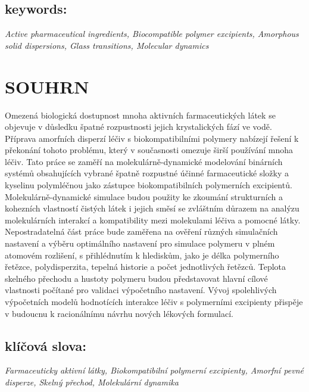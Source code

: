 \subsection*{keywords:}
\textit{Active pharmaceutical ingredients, Biocompatible polymer excipients, Amorphous solid dispersions, Glass transitions, Molecular dynamics}

\newpage
\section*{SOUHRN}
Omezená biologická dostupnost mnoha aktivních farmaceutických látek se objevuje v důsledku špatné rozpustnosti jejich krystalických fází ve vodě. Příprava amorfních disperzí léčiv s biokompatibilními polymery nabízejí řešení k překonání tohoto problému, který v současnosti omezuje širší používání mnoha léčiv. Tato práce se zaměří na molekulárně-dynamické modelování binárních systémů obsahujících vybrané špatně rozpustné účinné farmaceutické složky a kyselinu polymléčnou jako zástupce biokompatibilních polymerních excipientů. Molekulárně-dynamické simulace budou použity ke zkoumání strukturních a kohezních vlastností čistých látek i jejich směsí se zvláštním důrazem na analýzu molekulárních interakcí a kompatibility mezi molekulami léčiva a pomocné látky. Nepostradatelná část práce bude zaměřena na ověření různých simulačních nastavení a výběru optimálního nastavení pro simulace polymeru v plném atomovém rozlišení, s přihlédnutím k hlediskům, jako je délka polymerního řetězce, polydisperzita, tepelná historie a počet jednotlivých řetězců. Teplota skelného přechodu a hustoty polymeru budou představovat hlavní cílové vlastnosti počítané pro validaci výpočetního nastavení. Vývoj spolehlivých výpočetních modelů hodnotících interakce léčiv s polymerními excipienty přispěje v budoucnu k racionálnímu návrhu nových lékových formulací.


\subsection*{klíčová slova:}
\textit{Farmaceuticky aktivní látky, Biokompatibilní polymerní excipienty, Amorfní pevné disperze, Skelný přechod, Molekulární dynamika}


\newpage
\thispagestyle{empty}
\tableofcontents

